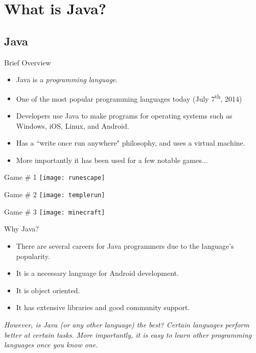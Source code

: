 \section{What is Java?}

\subsection{Java}

\begin{frame}{Brief Overview}

\begin{itemize}
\item Java is a \emph{programming language}. \pause
\item One of the most popular programming languages today (July 7\textsuperscript{th}, 2014) \pause
\item Developers use Java to make programs for operating systems such as Windows, iOS, Linux, and Android. \pause
\item Has a ``write once run anywhere" philosophy, and uses a virtual machine. \pause
\item More importantly it has been used for a few notable games...

\end{itemize}

\end{frame}

\begin{frame} Game \# 1
\texttt{[image: runescape]}

\end{frame}

\begin{frame} Game \# 2
\texttt{[image: templerun]}

\end{frame}

\begin{frame} Game \# 3
\texttt{[image: minecraft]}

\end{frame}



\begin{frame}{Why Java?}
\begin{itemize}
\item There are several careers for Java programmers due to the language's popularity.\pause
\item It is a necessary language for Android development. \pause
\item It is object oriented. \pause
\item It has extensive libraries and good community support. \pause
\end{itemize}
\emph{However, is Java (or any other language) the best? Certain languages perform better at certain tasks. More importantly, it is easy to learn other programming languages once you know one.}
\end{frame}

